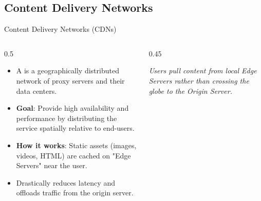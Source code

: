 \documentclass[aspectratio=169]{beamer}  %
\begin{document}
\subsection{Content Delivery Networks}
\begin{frame}[t]{Content Delivery Networks (CDNs)}
    \begin{columns}[T]
        \begin{column}{0.5\textwidth}
            \begin{itemize}
                \item A  is a geographically distributed network of proxy servers and their data centers.
                \item \textbf{Goal}: Provide high availability and performance by distributing the service spatially relative to end-users.
                \item \textbf{How it works}: Static assets (images, videos, HTML) are cached on "Edge Servers" near the user.
                \item Drastically reduces latency and offloads traffic from the origin server.
            \end{itemize}
        \end{column}
        \begin{column}{0.45\textwidth}
            \begin{center}
                \par\tiny\textit{Users pull content from local Edge Servers rather than crossing the globe to the Origin Server.}
            \end{center}
        \end{column}
    \end{columns}
\end{frame}
\end{document}
